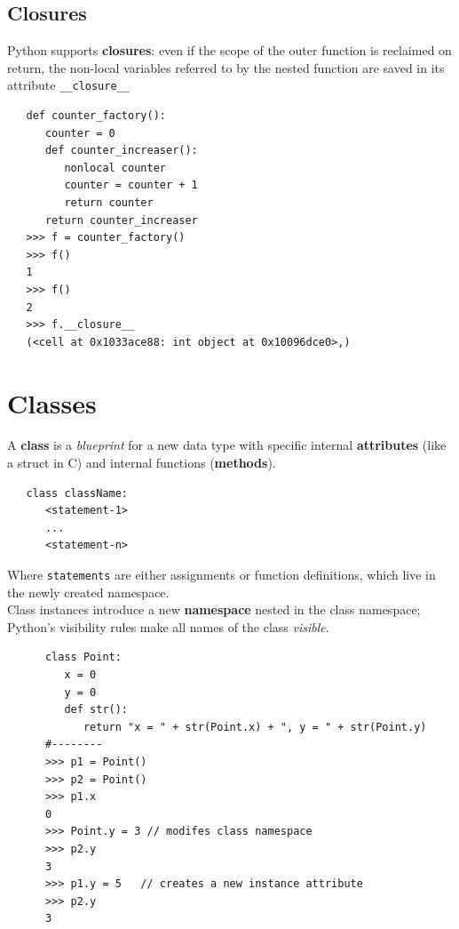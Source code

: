 \subsection{Closures}
Python supports \textbf{closures}: 
even if the scope of the
outer function is reclaimed on return, the non-local variables referred to by the nested function are saved
in its attribute \lstinline|__closure__|

\begin{lstlisting}
   def counter_factory():
      counter = 0
      def counter_increaser():
         nonlocal counter
         counter = counter + 1
         return counter
      return counter_increaser
   >>> f = counter_factory()
   >>> f()
   1
   >>> f()
   2
   >>> f.__closure__
   (<cell at 0x1033ace88: int object at 0x10096dce0>,)
\end{lstlisting}


\section{Classes}


A \textbf{class} is a \textit{blueprint} for a new data type with specific internal \textbf{attributes}
(like a struct in C) and internal functions (\textbf{methods}).

\begin{lstlisting}
   class className:
      <statement-1>
      ...
      <statement-n>
\end{lstlisting}
\newpage
\begin{paracol}{2}
   
   \colfill
   Where \lstinline|statements| are either assignments or function definitions, which live in the newly created namespace.\\
   Class instances introduce a new \textbf{namespace} nested in the class
   namespace; 
   Python's visibility rules make all names of the class \textit{visible}.
   \colfill

   \begin{lstlisting}
      class Point:
         x = 0
         y = 0
         def str():
            return "x = " + str(Point.x) + ", y = " + str(Point.y)
      #--------
      >>> p1 = Point()
      >>> p2 = Point()
      >>> p1.x
      0
      >>> Point.y = 3 // modifes class namespace
      >>> p2.y
      3
      >>> p1.y = 5   // creates a new instance attribute
      >>> p2.y
      3
   \end{lstlisting}
\end{paracol}

